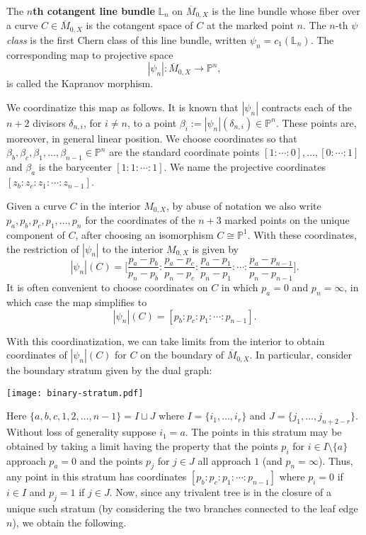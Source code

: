 \documentclass[11pt]{amsart}
\newcommand{\Mbar}{\overline{M}}
\newcommand{\bdpt}{\beta}
\newcommand{\bP}{\mathbb{P}}
\newcommand{\kapn}{|\psi_n|}
\numberwithin{thm}{section}
\numberwithin{equation}{section}
\numberwithin{figure}{section}
\theoremstyle{definition}
\begin{document}
The \textbf{$n$th cotangent line bundle} $\mathbb{L}_n$ on $\Mbar_{0,X}$ is the line bundle whose fiber over a curve $C\in \Mbar_{0,X}$ is the cotangent space of $C$ at the marked point $n$. The $n$-th \textit{$\psi$ class} is the first Chern class of this line bundle, written $\psi_n=c_1(\mathbb{L}_n)$. The corresponding map to projective space \[\kapn : \Mbar_{0,X} \to \mathbb{P}^n,\]
is called the Kapranov morphism.

We coordinatize this map as follows. It is known that $\kapn$ contracts each of the $n+2$ divisors $\delta_{n,i}$, for $i \ne n$, to a point $\bdpt_i := \kapn(\delta_{n,i}) \in \mathbb{P}^n$. These points are, moreover, in general linear position.  We choose coordinates so that $\bdpt_b, \bdpt_c, \bdpt_1, \ldots, \bdpt_{n-1} \in \mathbb{P}^n$ are the standard coordinate points $[1:\cdots : 0], \ldots, [0:\cdots:1]$ and $\bdpt_a$ is the barycenter $[1 : 1 : \cdots : 1]$. We name the projective coordinates $[z_b : z_c : z_1 : \cdots : z_{n-1}]$.
   
Given a curve $C$ in the interior $M_{0,X}$, by abuse of notation we also write $p_a,p_b,p_c,p_1,\dots,p_n$ for the coordinates of the $n+3$ marked points on the unique component of $C$, after choosing an isomorphism $C\cong \bP^1$. With these coordinates, the restriction of $\kapn$ to the interior $M_{0,X}$ is given by
\begin{equation} \label{eq:kap-interior}
    \kapn(C) = \bigg[
    \frac{p_a - p_b}{p_n - p_b} : 
    \frac{p_a - p_c}{p_n - p_c} : 
    \frac{p_a - p_1}{p_n - p_1} : 
    \cdots :
    \frac{p_a - p_{n-1}}{p_n - p_{n-1}}
    \bigg].
\end{equation}
It is often convenient to choose coordinates on $C$ in which $p_a = 0$ and $p_n = \infty$, in which case the map simplifies to
\[\kapn(C) = [p_b : p_c : p_1 : \cdots  : p_{n-1}].\]

With this coordinatization, we can take limits from the interior to obtain coordinates of $\kapn(C)$ for $C$ on the boundary of $\Mbar_{0,X}$.  In particular, consider the boundary stratum given by the dual graph:

\begin{center}
  \texttt{[image: binary-stratum.pdf]}
\end{center} Here $\{a,b,c,1,2,\ldots,n-1\}=I\sqcup J$ where $I=\{i_1,\ldots,i_r\}$ and $J=\{j_1,\ldots,j_{n+2-r}\}$. Without loss of generality suppose $i_1=a$.  The points in this stratum may be obtained by taking a limit having the property that the points $p_{i}$ for $i\in I\setminus \{a\}$ approach $p_a=0$ and the points $p_j$ for $j\in J$ all approach $1$ (and $p_n=\infty$).  Thus, any point in this stratum has coordinates $[p_b:p_c:p_1:\cdots :p_{n-1}]$ where $p_i=0$ if $i\in I$ and $p_{j}=1$ if $j\in J$.  Now, since any trivalent tree is in the closure of a unique such stratum (by considering the two branches connected to the leaf edge $n$), we obtain the following.
\end{document}
